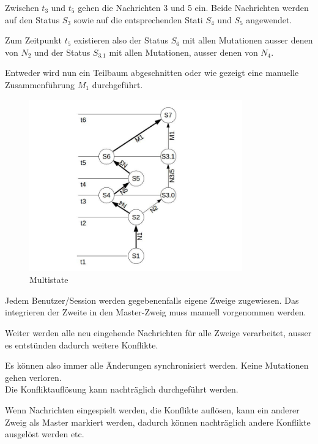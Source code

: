 \documentclass[oneside,11pt,parskip=half,ngerman]{scrreprt}
\makeatletter
\def\maxwidth{\ifdim\Gin@nat@width>\linewidth\linewidth
\else\Gin@nat@width\fi}
\let\Oldincludegraphics\includegraphics
\renewcommand{\includegraphics}[1]{\Oldincludegraphics[width=\maxwidth,height=20em,keepaspectratio]{#1}}
\makeatother
\begin{document}
Zwischen \(t_3\) und \(t_5\) gehen die Nachrichten 3 und 5 ein. Beide
Nachrichten werden auf den Status \(S_3\) sowie auf die entsprechenden
Stati \(S_4\) und \(S_5\) angewendet.

Zum Zeitpunkt \(t_5\) existieren also der Status \(S_6\) mit allen
Mutationen ausser denen von \(N_2\) und der Status \(S_{3.1}\) mit allen
Mutationen, ausser denen von \(N_4\).

Entweder wird nun ein Teilbaum abgeschnitten oder wie gezeigt eine
manuelle Zusammenführung \(M_1\) durchgeführt.

\begin{figure}[htbp]
\centering
\includegraphics{img/mulstistate.jpg}
\caption{Multistate\label{fig:multistate}}
\end{figure}

Jedem Benutzer/Session werden gegebenenfalls eigene Zweige zugewiesen.
Das integrieren der Zweite in den Master-Zweig muss manuell vorgenommen
werden.

Weiter werden alle neu eingehende Nachrichten für alle Zweige
verarbeitet, ausser es entstünden dadurch weitere Konflikte.

Es können also immer alle Änderungen synchronisiert werden. Keine
Mutationen gehen verloren.\\Die Konfliktauflösung kann nachträglich
durchgeführt werden.

Wenn Nachrichten eingespielt werden, die Konflikte auflösen, kann ein
anderer Zweig als Master markiert werden, dadurch können nachträglich
andere Konflikte ausgelöst werden etc.
\end{document}
